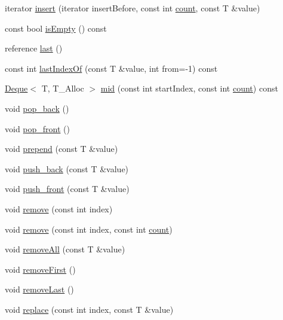 \begin{DoxyCompactItemize}
\item 
iterator \hyperlink{namespaceprism_a414531a413ed8c90d951f6fd94ac5535}{insert} (iterator insert\+Before, const int \hyperlink{namespaceprism_a024117fc3639cdf6598509edf22f034a}{count}, const T \&value)
\item 
const bool \hyperlink{namespaceprism_a538f7dd7bdd8d7963b39a9aea232a598}{is\+Empty} () const 
\item 
reference \hyperlink{namespaceprism_abe4956c4e865f55ca126b7fb973b5078}{last} ()
\item 
const int \hyperlink{namespaceprism_af0ed081bf6c17e965bfac0d207cd6c28}{last\+Index\+Of} (const T \&value, int from=-\/1) const 
\item 
\hyperlink{namespaceprism_a8e77ed12f9b3a35d81935362d3050d0c}{Deque}$<$ T, T\+\_\+\+Alloc $>$ \hyperlink{namespaceprism_aeb39a03321ba086c660e96bfa11d33c4}{mid} (const int start\+Index, const int \hyperlink{namespaceprism_a024117fc3639cdf6598509edf22f034a}{count}) const 
\item 
void \hyperlink{namespaceprism_a682dc15d5493595804b4cf818b16281d}{pop\+\_\+back} ()
\item 
void \hyperlink{namespaceprism_a407f71f548b4930e7880b44cd695b33d}{pop\+\_\+front} ()
\item 
void \hyperlink{namespaceprism_ac5a9a7c94d57bb61f25a61ef10d74b80}{prepend} (const T \&value)
\item 
void \hyperlink{namespaceprism_aae03a861ef55e15b5a64c5cb2a727667}{push\+\_\+back} (const T \&value)
\item 
void \hyperlink{namespaceprism_a9a451a8db591d6c4fc315b05f9bff515}{push\+\_\+front} (const T \&value)
\item 
void \hyperlink{namespaceprism_a5b180b06c92cd65b70d2e565878e5d06}{remove} (const int index)
\item 
void \hyperlink{namespaceprism_a2a67eb6dd63f426b2837aebb07940b0b}{remove} (const int index, const int \hyperlink{namespaceprism_a024117fc3639cdf6598509edf22f034a}{count})
\item 
void \hyperlink{namespaceprism_a91a96073d835746d48ba0a145c33b29e}{remove\+All} (const T \&value)
\item 
void \hyperlink{namespaceprism_a32a0d96bc03a45529e399cd39c48cb66}{remove\+First} ()
\item 
void \hyperlink{namespaceprism_a7dd774edd9e5b7398334440070da6bdd}{remove\+Last} ()
\item 
void \hyperlink{namespaceprism_acac76605957b60675b2859cef694c61f}{replace} (const int index, const T \&value)

\end{DoxyCompactItemize}
